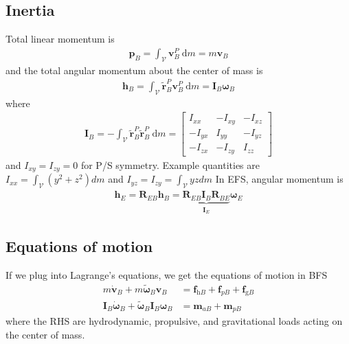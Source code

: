 \documentclass[10pt]{article}
\newcommand{\mbf}[1]{\mathbf{#1}}
\newcommand{\mcal}[1]{\mathcal{#1}} %
\newcommand{\be}{\begin{eqnarray}}
\newcommand{\ee}{\end{eqnarray}}
\newcommand{\ben}{\begin{eqnarray*}}
\newcommand{\een}{\end{eqnarray*}}
\newcommand{\tn}[1]{\textrm{#1}}
\begin{document}
\subsection{Inertia}
Total linear momentum is
\ben
\mbf{p}_B=\int_{\mathcal{V}} \mbf{v}_B^P \mathrm{~d} m
= m \mbf{v}_B
\een
and the total angular momentum about the center of mass is
\ben
\mbf{h}_B=\int_{\mathcal{V}} \tilde{\mbf{r}}_B^P \mbf{v}_B^P \mathrm{~d} m
= \mbf{I}_B \boldsymbol{\omega}_B
\een
%
where
\ben
\mbf{I}_B=-\int_{\mathcal{V}} \tilde{\mbf{r}}_B^P \tilde{\mbf{r}}_B^P \mathrm{~d} m=\left[\begin{array}{ccc}
        I_{x x}  & -I_{x y} & -I_{x z} \\
        -I_{y x} & I_{y y}  & -I_{y z} \\
        -I_{z x} & -I_{z y} & I_{z z}
    \end{array}\right]
\een
and $I_{xy} = I_{zy} = 0$ for P/S symmetry.
Example quantities are $\textstyle I_{xx} = \int_{\mcal{V}}\left(y^2+z^2\right) dm$ and $\textstyle I_{yz}=I_{zy}=\int_{\mcal{V}} yz dm$
In EFS, angular momentum is
\ben
\mbf{h}_E=\mbf{R}_{E B} \mbf{h}_B= \underbrace{\mbf{R}_{E B} \mbf{I}_B \mbf{R}_{B E}}_{\mbf{I}_E} \boldsymbol{\omega}_E
\een
\subsection{Equations of motion}
% 
If we plug into Lagrange's equations, we get the equations of motion in BFS
%
\begin{align}
    m\dot{\mbf{v}}_B + m \tilde{\boldsymbol{\omega}}_B\mbf{v}_B                                         & =  \mbf{f}_{\tn{h}B} + \mbf{f}_{pB}  + \mbf{f}_{\tn{g}B} \\
    \mbf{I}_B \dot{\boldsymbol{\omega}}_B+\tilde{\boldsymbol{\omega}}_B \mbf{I}_B \boldsymbol{\omega}_B & = \mbf{m}_{a B}+\mbf{m}_{p B}
\end{align}
where the RHS are hydrodynamic, propulsive, and gravitational loads acting on the center of mass.
% 
\end{document}
